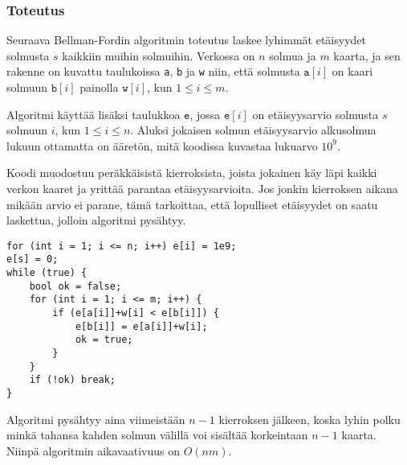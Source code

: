 \begin{center}
\end{center}

\subsubsection{Toteutus}

Seuraava Bellman-Fordin algoritmin toteutus
laskee lyhimmät etäisyydet solmusta $s$
kaikkiin muihin solmuihin.
Verkossa on $n$ solmua ja $m$ kaarta,
ja sen rakenne on kuvattu taulukoissa
\texttt{a}, \texttt{b} ja \texttt{w}
niin, että solmusta $\texttt{a}[i]$
on kaari solmuun $\texttt{b}[i]$
painolla $\texttt{w}[i]$, kun $1 \le i \le m$.

Algoritmi käyttää lisäksi
taulukkoa $\texttt{e}$,
jossa $\texttt{e}[i]$
on etäisyysarvio solmusta $s$ solmuun $i$,
kun $1 \le i \le n$.
Aluksi jokaisen solmun etäisyysarvio alkusolmua
lukuun ottamatta on ääretön,
mitä koodissa kuvastaa lukuarvo $10^9$.

Koodi muodostuu peräkkäisistä kierroksista,
joista jokainen käy läpi kaikki verkon kaaret
ja yrittää parantaa etäisyysarvioita.
Jos jonkin kierroksen aikana mikään arvio ei parane,
tämä tarkoittaa, että lopulliset etäisyydet
on saatu laskettua, jolloin algoritmi pysähtyy.

\begin{lstlisting}
for (int i = 1; i <= n; i++) e[i] = 1e9;
e[s] = 0;
while (true) {
    bool ok = false;
    for (int i = 1; i <= m; i++) {
        if (e[a[i]]+w[i] < e[b[i]]) {
            e[b[i]] = e[a[i]]+w[i];
            ok = true;
        }
    }
    if (!ok) break;
}
\end{lstlisting}
Algoritmi pysähtyy aina viimeistään $n-1$
kierroksen jälkeen,
koska lyhin polku minkä
tahansa kahden solmun välillä voi sisältää
korkeintaan $n-1$ kaarta.
Niinpä algoritmin aikavaativuus on $O(nm)$.

